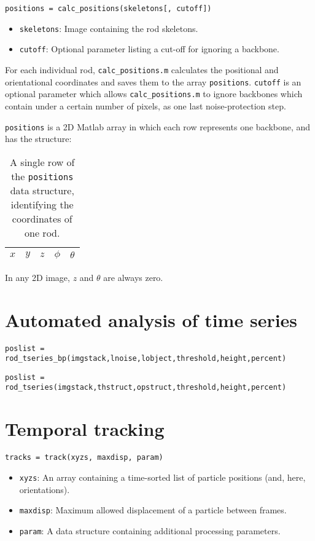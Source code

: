 \texttt{positions = calc\_positions(skeletons[, cutoff])}

\begin{itemize}
\item \texttt{skeletons}: Image containing the rod skeletons.
\item \texttt{cutoff}: Optional parameter listing a cut-off for ignoring a backbone.
\end{itemize}

For each individual rod, \texttt{calc\_positions.m} calculates the positional and
orientational coordinates and saves them to the array \texttt{positions}.  
\texttt{cutoff} is an optional parameter which allows \texttt{calc\_positions.m} to 
ignore backbones which contain under a certain number of pixels, as one last noise-protection step.

\texttt{positions} is a 2D Matlab array in which each row represents one backbone, and has 
the structure:

\begin{table}[h]
\begin{center}
\begin{tabular}{ | c | c | c | c | c | }
\hline 
$x$ & $y$ & $z$ & $\phi$ & $\theta$ \\
\hline
\end{tabular}
\end{center}
\caption{A single row of the \texttt{positions} data structure, identifying the coordinates of one rod.}
\label{tab:positions}
\end{table}

In any 2D image, $z$ and $\theta$ are always zero.

\section{Automated analysis of time series}

\texttt{poslist = rod\_tseries\_bp(imgstack,lnoise,lobject,threshold,height,percent)}

\texttt{poslist = rod\_tseries(imgstack,thstruct,opstruct,threshold,height,percent)}

\section{Temporal tracking}

\texttt{tracks = track(xyzs, maxdisp, param)}

\begin{itemize}
\item \texttt{xyzs}: An array containing a time-sorted list of particle positions (and, here, orientations).
\item \texttt{maxdisp}: Maximum allowed displacement of a particle between frames.
\item \texttt{param}: A data structure containing additional processing parameters.
\end{itemize}

